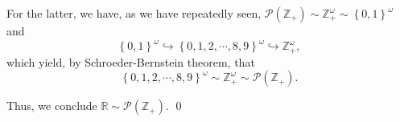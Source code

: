 \documentclass[a4paper,12pt]{article}
\begin{document}
\begin{sol}
	For the latter, we have, as we have  repeatedly seen,
	\( \mathcal{P}(\mathbb{Z}_{+})
	\sim
	\mathbb{Z}_{+}^{\omega}
	\sim
	\left\{ 0,1 \right\}^{\omega}
	\)
	and
	\begin{equation*}
		\left\{ 0,1 \right\}^{\omega}
		\hookrightarrow
		\left\{ 0,1,2,\cdots,8,9 \right\}^{\omega}
		\hookrightarrow
		\mathbb{Z}_{+}^{\omega},
	\end{equation*}
	which yield, by Schroeder-Bernstein theorem, that
	\begin{equation*}
		\left\{ 0,1,2,\cdots,8,9 \right\}^{\omega}
		\sim
		\mathbb{Z}_{+}^{\omega}
		\sim
		\mathcal{P}(\mathbb{Z}_{+}).
	\end{equation*}
	
	Thus, we conclude
	\( \mathbb{R} \sim \mathcal{P}(\mathbb{Z}_{+}) \).
	\qed\end{sol}
\end{document}
